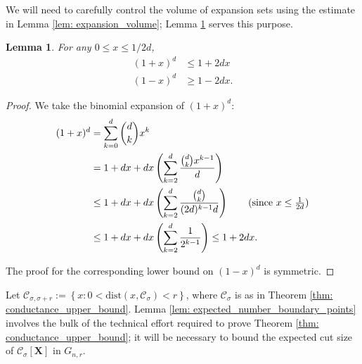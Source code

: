 \documentclass{article}
\newcommand{\set}[1]{\left\{#1\right\}}
\newcommand{\1}{\mathbf{1}}
\newcommand{\dist}{\mathrm{dist}}
\newcommand{\Xbf}{\mathbf{X}}
\newcommand{\Cset}{\mathcal{C}}
\newcommand{\Csig}{\Cset_{\sigma}}
\newcommand{\Csigr}{\Cset_{\sigma,\sigma + r}}
\theoremstyle{aldenthm}
\newtheorem{lemma}{Lemma}
\begin{document}
We will need to carefully control the volume of expansion sets using the estimate in Lemma \ref{lem: expansion_volume}; Lemma \ref{lem: Taylor_series} serves this purpose.
\begin{lemma}
	\label{lem: Taylor_series}
	For any $0 \leq x \leq 1/2d$,
	\begin{align*}
	(1 + x)^d & \leq 1 + 2dx \\
	(1 - x)^d & \geq 1 - 2dx.
	\end{align*}
\end{lemma}
\begin{proof}
	We take the binomial expansion of $(1 + x)^d$:
	\begin{align*}
	(1 + x)^d & = \sum_{k = 0}^{d} {d \choose k} x^k \\
	& = 1 + dx + dx\left(\sum_{k = 2}^d \frac{{d \choose k} x^{k - 1}}{d}\right)\\
	& \leq 1 + dx + dx\left(\sum_{k = 2}^d \frac{{d \choose k}}{(2d)^{k-1}d}\right) \tag{since $x \leq \frac{1}{2d}$} \\
	& \leq 1 + dx + dx\left(\sum_{k = 2}^d \frac{1}{2^{k - 1}}\right) \leq 1 + 2dx.
	\end{align*}
	
	The proof for the corresponding lower bound on $(1 - x)^d$ is symmetric.
\end{proof}

Let $\Csigr := \set{x: 0 < \dist(x, \Csig) < r}$, where $\Csig$ is as in Theorem \ref{thm: conductance_upper_bound}. Lemma \ref{lem: expected_number_boundary_points} involves the bulk of the technical effort required to prove Theorem \ref{thm: conductance_upper_bound}; it will be necessary to bound the expected cut size of $\Csig[\Xbf]$ in $G_{n,r}$. 
\end{document}
